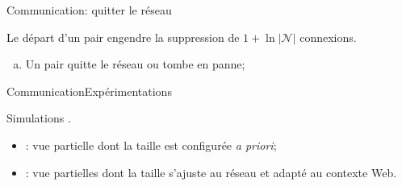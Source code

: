\begin{frame}{Communication}{\SPRAY : quitter le réseau}

  Le départ d'un pair engendre la suppression de $1+\ln|\mathcal{N}|$ connexions.

  \vspace{0.5cm}

  \begin{minipage}{0.6\textwidth}
    \begin{enumerate}[(a)]
    \item Un pair quitte le réseau ou tombe en panne;
    \end{enumerate}
  \end{minipage}
  \hfill
  \begin{minipage}{0.37\textwidth}
    \begin{center}
      
    \end{center}
  \end{minipage}

  \vspace{1cm}
  \large
  \begin{itemize}
  \end{itemize}
 
\end{frame}


\begin{frame}{Communication}{Expérimentations}

  Simulations \PEERSIM.

  \vspace{0.5cm}

  \begin{itemize}
  \item \CYCLON : vue partielle dont la taille est configurée \textit{a priori};
  \item \SPRAY : vue partielles dont la taille s'ajuste au réseau et adapté au
    contexte Web.
  \end{itemize}

\end{frame}

